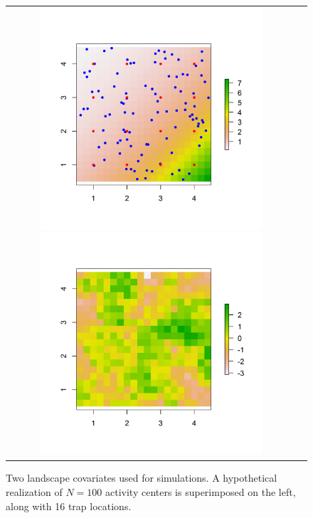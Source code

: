 \documentclass[12pt]{article}
\begin{document}
\begin{figure}
\begin{tabular}{cc}
\includegraphics[height=3.25in,width=3.25in]{figs/raster_withN100}
\includegraphics[height=3.25in,width=3.25in]{figs/raster_krige} &
\end{tabular}
\caption{
Two landscape covariates used for simulations. A hypothetical
  realization of $N=100$ activity centers is superimposed on the left,
along with 16 trap locations.
}
\label{ecoldist.fig.raster100}
\end{figure}




\clearpage

\newpage
\end{document}
